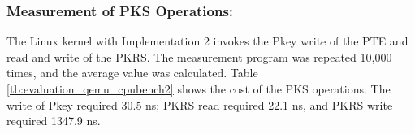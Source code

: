 
\subsubsection{Measurement of PKS Operations:}

The Linux kernel with Implementation 2 invokes the Pkey write of the PTE and
read and write of the PKRS. The measurement program was repeated 10,000 times, and
the average value was calculated.
Table \ref{tb:evaluation_qemu_cpubench2} shows the cost of the PKS operations.
The write of Pkey required 30.5 ns; PKRS read required 22.1 ns, and PKRS
write required 1347.9 ns.

%




  


